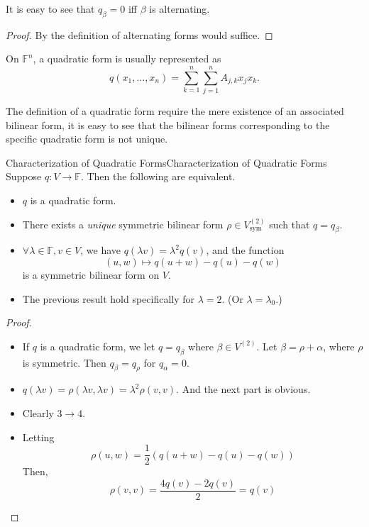 \documentclass[../main.tex]{subfiles}
\begin{document}
It is easy to see that $q_{\beta} = 0$ iff $\beta$ is alternating.
\begin{proof}
	By the definition of alternating forms would suffice.
\end{proof}

On $\mathbb{F}^{n}$, a quadratic form is usually represented as
\begin{equation}
q(x_1, \ldots ,x_n) = \sum_{k=1}^{n} \sum_{j=1}^{n} A_{j,k}x_jx_k.
\end{equation}

The definition of a quadratic form require the mere existence of an associated bilinear form, it is easy to see that the bilinear forms corresponding to the specific quadratic form is not unique.

\begin{theorem}{Characterization of Quadratic Forms}{Characterization of Quadratic Forms}
Suppose $q: V \rightarrow \mathbb{F}$. Then the following are equivalent.
\begin{itemize}
\item $q$ is a quadratic form.
\item There exists a \emph{unique} symmetric bilinear form $\rho\in V_{\text{sym}}^{(2)}$ such that $q = q_{\beta}$.
\item $\forall \lambda\in \mathbb{F},v\in V$, we have $q(\lambda v) = \lambda^2q(v)$, and the function
	\begin{equation*}
		(u,w) \mapsto q(u+w)-q(u)-q(w)
	\end{equation*}
	is a symmetric bilinear form on $V$.
\item The previous result hold specifically for $\lambda=2$. (Or $\lambda=\lambda_0$.)
\end{itemize}
\end{theorem}
\begin{proof}
\begin{itemize}
\item If $q$ is a quadratic form, we let $q=q_{\beta}$ where $\beta\in V^{(2)}$. Let $\beta = \rho+\alpha$, where $\rho$ is symmetric. Then $q_{\beta} = q_{\rho}$ for $q_{\alpha}=0$.
\item $q(\lambda v) = \rho(\lambda v,\lambda v) = \lambda^2 \rho(v,v)$. And the next part is obvious.
\item Clearly $3 \rightarrow 4$.
\item Letting
	\begin{equation*}
	\rho(u,w) = \frac{1}{2} \left(q(u+w)-q(u)-q(w)\right)
	\end{equation*}
	Then,
	\begin{equation*}
	\rho(v,v) = \frac{4q(v)-2q(v)}{2} = q(v)
	\end{equation*}
\end{itemize}
\end{proof}
\end{document}
